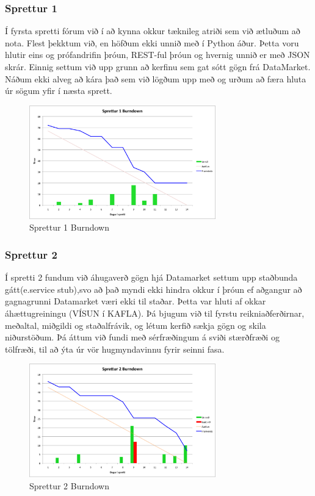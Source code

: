 \documentclass{article}
\begin{document}
\subsubsection{Sprettur 1}
Í fyrsta spretti fórum við í að kynna okkur tæknileg atriði sem við ætluðum að nota.
Flest þekktum við, en höfðum ekki unnið með í Python áður. Þetta voru hlutir eins og prófandrifin þróun, REST-ful þróun og hvernig 
unnið er með JSON skrár. Einnig settum við upp grunn að kerfinu sem gat sótt gögn frá DataMarket. Náðum ekki alveg að kára það sem við lögðum 
upp með og urðum að færa hluta úr sögum yfir í næsta sprett.
\begin{figure}[H]
  \centering
  \includegraphics[width=0.72\textwidth]{Sprettur1_Burndown.png}
  \caption{Sprettur 1 Burndown}
\end{figure}

\subsubsection{Sprettur 2}
Í spretti 2 fundum við áhugaverð gögn hjá Datamarket settum upp staðbunda gátt(e.service stub),svo að það myndi ekki hindra okkur í þróun ef 
aðgangur að gagnagrunni Datamarket væri ekki til staðar. Þetta var hluti af okkar áhættugreiningu (VÍSUN í KAFLA). 
Þá bjugum við til fyrstu reikniaðferðirnar, meðaltal, miðgildi og staðalfrávik, og létum kerfið sækja gögn og skila niðurstöðum.
Þá áttum við fundi með sérfræðingum á sviði stærðfræði og tölfræði, til að ýta úr vör hugmyndavinnu fyrir seinni fasa.
\begin{figure}[H]
 \centering
 \includegraphics[width=0.72\textwidth]{Sprettur2_Burndown.png}
 \caption{Sprettur 2 Burndown}
\end{figure}
\end{document}
